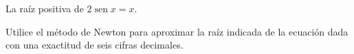 \item La raíz positiva de $2 \operatorname{sen} x = x$.
\par
Utilice el método de Newton para aproximar la raíz indicada de la ecuación dada con una exactitud de seis cifras decimales.
